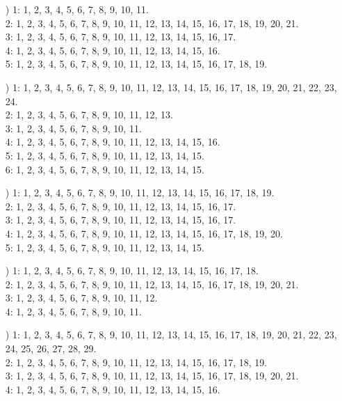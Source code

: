 \documentclass[a4paper,11pt]{article}
\numberwithin{equation}{section}
\begin{document}
\begin{itemize}
\item[\romannumeral5)] 1: 1, 2, 3, 4, 5, 6, 7, 8, 9, 10, 11. \\
  2: 1, 2, 3, 4, 5, 6, 7, 8, 9, 10, 11, 12, 13, 14, 15, 16, 17, 18, 19, 20,
  21. \\
  3: 1, 2, 3, 4, 5, 6, 7, 8, 9, 10, 11, 12, 13, 14, 15, 16, 17. \\
  4: 1, 2, 3, 4, 5, 6, 7, 8, 9, 10, 11, 12, 13, 14, 15, 16. \\
  5: 1, 2, 3, 4, 5, 6, 7, 8, 9, 10, 11, 12, 13, 14, 15, 16, 17, 18, 19.

\item[\romannumeral6)] 1: 1, 2, 3, 4, 5, 6, 7, 8, 9, 10, 11, 12, 13, 14,
  15, 16, 17, 18, 19, 20, 21, 22, 23, 24. \\
  2: 1, 2, 3, 4, 5, 6, 7, 8, 9, 10, 11, 12, 13. \\
  3: 1, 2, 3, 4, 5, 6, 7, 8, 9, 10, 11. \\
  4: 1, 2, 3, 4, 5, 6, 7, 8, 9, 10, 11, 12, 13, 14, 15, 16. \\
  5: 1, 2, 3, 4, 5, 6, 7, 8, 9, 10, 11, 12, 13, 14, 15. \\
  6: 1, 2, 3, 4, 5, 6, 7, 8, 9, 10, 11, 12, 13, 14, 15.

\item[\romannumeral7)] 1: 1, 2, 3, 4, 5, 6, 7, 8, 9, 10, 11, 12, 13, 14, 15,
  16, 17, 18, 19. \\
  2: 1, 2, 3, 4, 5, 6, 7, 8, 9, 10, 11, 12, 13, 14, 15, 16, 17. \\
  3: 1, 2, 3, 4, 5, 6, 7, 8, 9, 10, 11, 12, 13, 14, 15, 16, 17. \\
  4: 1, 2, 3, 4, 5, 6, 7, 8, 9, 10, 11, 12, 13, 14, 15, 16, 17, 18, 19,
  20. \\
  5: 1, 2, 3, 4, 5, 6, 7, 8, 9, 10, 11, 12, 13, 14, 15.

\item[\romannumeral8)] 1: 1, 2, 3, 4, 5, 6, 7, 8, 9, 10, 11, 12, 13, 14,
  15, 16, 17, 18. \\
  2: 1, 2, 3, 4, 5, 6, 7, 8, 9, 10, 11, 12, 13, 14, 15, 16, 17, 18, 19, 20,
  21. \\
  3: 1, 2, 3, 4, 5, 6, 7, 8, 9, 10, 11, 12. \\
  4: 1, 2, 3, 4, 5, 6, 7, 8, 9, 10, 11.

\item[\romannumeral9)] 1: 1, 2, 3, 4, 5, 6, 7, 8, 9, 10, 11, 12, 13, 14, 15,
  16, 17, 18, 19, 20, 21, 22, 23, 24, 25, 26, 27, 28, 29. \\
  2: 1, 2, 3, 4, 5, 6, 7, 8, 9, 10, 11, 12, 13, 14, 15, 16, 17, 18, 19. \\
  3: 1, 2, 3, 4, 5, 6, 7, 8, 9, 10, 11, 12, 13, 14, 15, 16, 17, 18, 19, 20,
  21. \\
  4: 1, 2, 3, 4, 5, 6, 7, 8, 9, 10, 11, 12, 13, 14, 15, 16.

\end{itemize}
\end{document}
